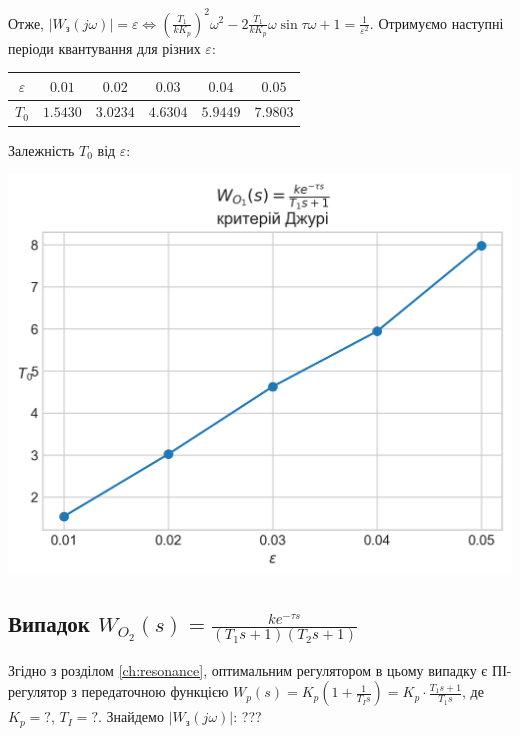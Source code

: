 Отже, $\left| W_{\text{з}}(j\omega) \right| = \varepsilon \Leftrightarrow \left(\frac{T_1}{k K_p}\right)^2 \omega^2 - 2\frac{T_1}{k K_p} \omega \sin \tau\omega + 1 = \frac{1}{\varepsilon^2}$.
Отримуємо наступні періоди квантування для різних $\varepsilon$:
\begin{center}
    \begin{tabular}{|c|c|c|c|c|c|}
        \hline
        $\varepsilon$ & $0.01$ & $0.02$ & $0.03$ & $0.04$ & $0.05$ \\
        \hline
        $T_0$ & $1.5430$ & $3.0234$ & $4.6304$ & $5.9449$ & $7.9803$ \\
        \hline
    \end{tabular}
\end{center}
Залежність $T_0$ від $\varepsilon$:
\begin{center}
    \includegraphics[scale=0.9]{pics/W_01_Jury.png}
\end{center}

\subsection{Випадок \texorpdfstring{$W_{O_2}(s) = \frac{k e^{-\tau s}}{(T_1 s + 1)(T_2 s + 1)}$}{2}}
Згідно з розділом \ref{ch:resonance}, оптимальним регулятором в цьому випадку є ПІ-регулятор з передаточною функцією 
$W_p(s) = K_p \left(1 + \frac{1}{T_I s}\right) = K_p \cdot \frac{T_1 s + 1}{T_1 s}$, де $K_p = ?$, $T_I = ?$.
Знайдемо $\left| W_{\text{з}}(j\omega) \right|$: ???

